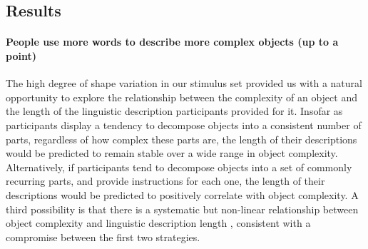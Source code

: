 \documentclass[10pt,letterpaper]{article}
\begin{document}
\subsection{Results}

\paragraph{People use more words to describe more complex objects (up to a point)}
The high degree of shape variation in our stimulus set provided us with a natural opportunity to explore the relationship between the complexity of an object and the length of the linguistic description participants provided for it.
Insofar as participants display a tendency to decompose objects into a consistent number of parts, regardless of how complex these parts are, the length of their descriptions would be predicted to remain stable over a wide range in object complexity. 
Alternatively, if participants tend to decompose objects into a set of commonly recurring parts, and provide instructions for each one, the length of their descriptions would be predicted to positively correlate with object complexity. 
A third possibility is that there is a systematic but non-linear relationship between object complexity and linguistic description length \cite{sun2021seeing}, consistent with a compromise between the first two strategies. 
\end{document}
